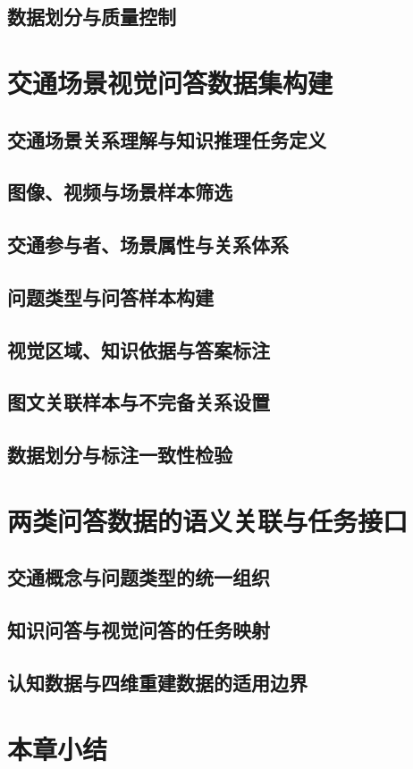 \subsection{数据划分与质量控制}

\section{交通场景视觉问答数据集构建}

\subsection{交通场景关系理解与知识推理任务定义}

\subsection{图像、视频与场景样本筛选}

\subsection{交通参与者、场景属性与关系体系}

\subsection{问题类型与问答样本构建}

\subsection{视觉区域、知识依据与答案标注}

\subsection{图文关联样本与不完备关系设置}

\subsection{数据划分与标注一致性检验}

\section{两类问答数据的语义关联与任务接口}

\subsection{交通概念与问题类型的统一组织}

\subsection{知识问答与视觉问答的任务映射}

\subsection{认知数据与四维重建数据的适用边界}

\section{本章小结}
